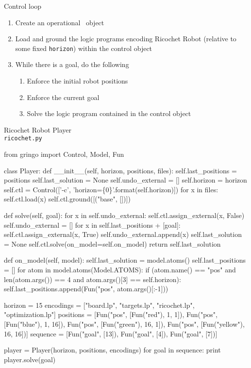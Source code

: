 \begin{frame}[c]{Control loop}
\begin{enumerate}
\item Create an operational \clingo\ object
\smallskip
\item Load and ground the logic programs encoding Ricochet Robot
  (relative to some fixed \lstinline{horizon})
  within the control object
\smallskip
\item While there is a goal, do the following
  \begin{enumerate}\normalsize
  \item Enforce the initial robot positions
  \item Enforce the current goal
  \item Solve the logic program contained in the control object
  \end{enumerate}
\end{enumerate}
\bigskip
\end{frame}
\begin{frame}[fragile]{Ricochet Robot Player\\[-5pt]\large\texttt{ricochet.py}}
\Tiny\vspace{-15pt}
\begin{semiverbatim}
from gringo import Control, Model, Fun

class Player:
    def __init__(self, horizon, positions, files):
        self.last_positions = positions
        self.last_solution = None
        self.undo_external = []
        self.horizon = horizon
        self.ctl = Control(['-c', 'horizon=\{0\}'.format(self.horizon)])
        for x in files:
            self.ctl.load(x)
        self.ctl.ground([("base", [])])

    def solve(self, goal):
        for x in self.undo_external:
            self.ctl.assign_external(x, False)
        self.undo_external = []
        for x in self.last_positions + [goal]:
            self.ctl.assign_external(x, True)
            self.undo_external.append(x)
        self.last_solution = None
        self.ctl.solve(on_model=self.on_model)
        return self.last_solution

    def on_model(self, model):
        self.last_solution = model.atoms()
        self.last_positions = []
        for atom in model.atoms(Model.ATOMS):
            if (atom.name() == "pos" and len(atom.args()) == 4 and atom.args()[3] == self.horizon):
                self.last_positions.append(Fun("pos", atom.args()[:-1]))

horizon   = 15
encodings = ["board.lp", "targets.lp", "ricochet.lp", "optimization.lp"]
positions = [Fun("pos", [Fun("red"),     1,  1]), Fun("pos", [Fun("blue"),    1, 16]),
             Fun("pos", [Fun("green"),  16,  1]), Fun("pos", [Fun("yellow"), 16, 16])]
sequence  = [Fun("goal", [13]), Fun("goal", [4]), Fun("goal", [7])]

player = Player(horizon, positions, encodings)
for goal in sequence:
    print player.solve(goal)
\end{semiverbatim}
\end{frame}
